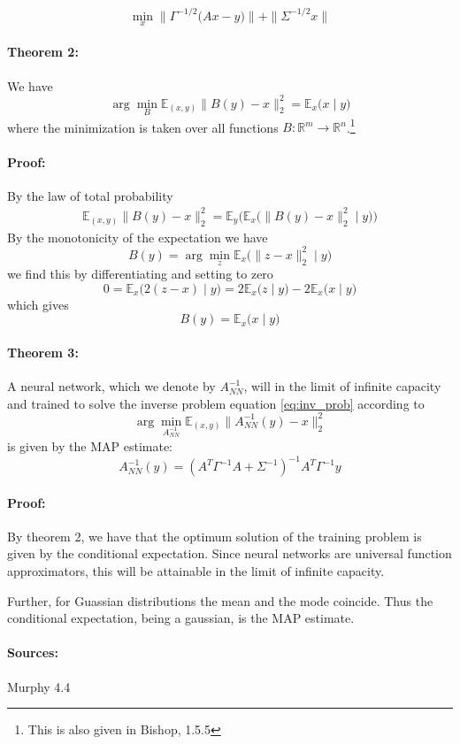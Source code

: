 \documentclass[a4paper,10pt]{article}
\begin{document}
	\[
		\min_x \| \Gamma^{-1/2} \bigl(Ax - y\bigr) \| + \|\Sigma^{-1/2} x\|
	\]
	
	\paragraph{Theorem 2:} We have
	\[
		\arg \min_{B} \mathbb{E}_{(x, y)} \|B(y) - x\|_2^2 = \mathbb{E}_{x}\bigl(x \mid y \bigr)
	\]
	where the minimization is taken over all functions $B \colon \mathbb{R}^m \to \mathbb{R}^n$.\footnote{This is also given in Bishop, 1.5.5}
	
	\paragraph{Proof:} By the law of total probability
	\begin{align*}
		\mathbb{E}_{(x, y)} \|B(y) - x\|_2^2 = 
		\mathbb{E}_{y} \bigl(\mathbb{E}_{x}\bigl(\|B(y) - x\|_2^2 \mid y \bigr)\bigr)
	\end{align*}
	By the monotonicity of the expectation we have
	\[
		B(y) = \arg\min_{z} \mathbb{E}_{x}\bigl(\|z - x\|_2^2 \mid y \bigr)
	\]
	we find this by differentiating and setting to zero
	\[
	    0 =
	    \mathbb{E}_{x}\bigl(2 (z - x) \mid y \bigr) =
	    2\mathbb{E}_{x}\bigl(z \mid y \bigr) - 2\mathbb{E}_{x}\bigl(x \mid y \bigr)
	\]
	which gives
	\[
		B(y) = \mathbb{E}_{x}\bigl(x \mid y \bigr)
	\]
	
	\paragraph{Theorem 3:} A neural network, which we denote by $A^{-1}_{NN}$, will in the limit of infinite capacity and trained to solve the inverse problem equation \ref{eq:inv_prob} according to
	\[
		\arg \min_{A^{-1}_{NN}} \mathbb{E}_{(x, y)} \|A^{-1}_{NN}(y) - x\|_2^2
	\]
	is given by the MAP estimate:
	\[
		A^{-1}_{NN}(y) = (A^T \Gamma^{-1} A + \Sigma^{-1})^{-1} A^T \Gamma^{-1} y
	\]
	
	\paragraph{Proof:} By theorem 2, we have that the optimum solution of the training problem is given by the conditional expectation. Since neural networks are universal function approximators, this will be attainable in the limit of infinite capacity.
	
	Further, for Guassian distributions the mean and the mode coincide. Thus the conditional expectation, being a gaussian, is the MAP estimate.
	
	\paragraph{Sources:}
	
	Murphy 4.4
	
\end{document}
